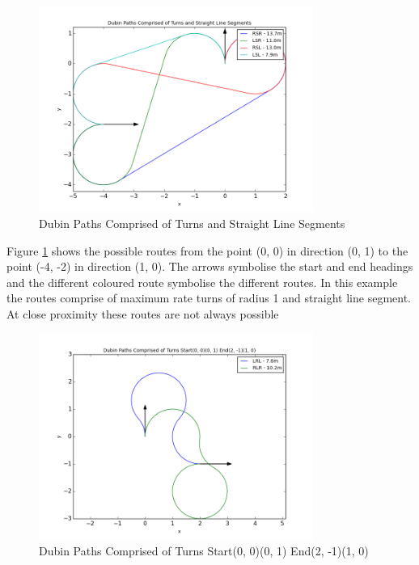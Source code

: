 \documentclass[a4paper,12pt,twoside]{article}
\begin{document}
\begin{figure}[H]
\centering
\includegraphics[width=0.8\textwidth]{figures/dubin_paths_comprised_of_turns_and_straight_line_segments.png} 
\caption{Dubin Paths Comprised of Turns and Straight Line Segments}
\label{fig:dubin_paths_comprised_of_turns_and_straight_line_segments}
\end{figure}

Figure \ref{fig:dubin_paths_comprised_of_turns_and_straight_line_segments} shows the possible routes from the point (0, 0) in direction (0, 1) to the point (-4, -2) in direction (1, 0). The arrows symbolise the start and end headings and the different coloured route symbolise the different routes. In this example the routes comprise of maximum rate turns of radius 1 and straight line segment. At close proximity these routes are not always possible

\begin{figure}[H]
\centering
\includegraphics[width=0.8\textwidth]{figures/dubin_paths_comprised_of_turns_start(0,_0)(0,_1)_end(2,_-1)(1,_0).png} 
\caption{Dubin Paths Comprised of Turns Start(0, 0)(0, 1) End(2, -1)(1, 0)}
\label{fig:dubin_paths_comprised_of_turns_start(0,_0)(0,_1)_end(2,_-1)(1,_0)}
\end{figure}
\end{document}
